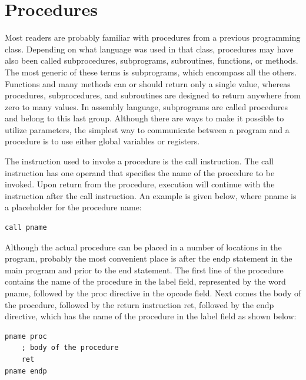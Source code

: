 \documentclass[10pt]{book}
\begin{document}
\section{Procedures}
Most readers are probably familiar with procedures from a previous programming class. Depending on what language was used in that class, procedures may have also been called subprocedures, subprograms, subroutines, functions, or methods. The most generic of these terms is subprograms, which encompass all the others. Functions and many methods can or should return only a single value, whereas procedures, subprocedures, and subroutines are designed to return anywhere from zero to many values. In assembly language, subprograms are called procedures and belong to this last group. Although there are ways to make it possible to utilize parameters, the simplest way to communicate between a program and a procedure is to use either global variables or registers.

The instruction used to invoke a procedure is the call instruction. The call instruction has one operand that specifies the name of the procedure to be invoked. Upon return from the procedure, execution will continue with the instruction after the call instruction. An example is given below, where pname is a placeholder for the procedure name:

\begin{verbatim}
call pname
\end{verbatim}

Although the actual procedure can be placed in a number of locations in the program, probably the most convenient place is after the endp statement in the main program and prior to the end statement. The first line of the procedure contains the name of the procedure in the label field, represented by the word pname, followed by the proc directive in the opcode field. Next comes the body of the procedure, followed by the return instruction ret, followed by the endp directive, which has the name of the procedure in the label field as shown below:

\begin{verbatim}
pname proc
    ; body of the procedure
    ret
pname endp
\end{verbatim}
\end{document}

